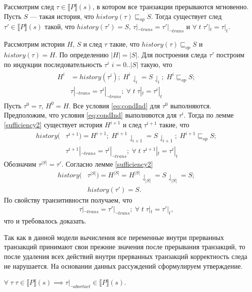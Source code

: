 \begin{lemma}\label{sufficiency3}
Рассмотрим след $\tau \in \llbracket P \rrbracket (s)$, в котором все транзакции прерываются мгновенно. Пусть $S$ --- такая история, что $history(\tau) \sqsubseteq_{op} S$. Тогда существует след $\tau' \in \llbracket P \rrbracket (s)$ такой, что $history(\tau') = S$, $\tau|_{\neg trans} = \tau'|_{\neg trans}$ и $\forall \; t \; \tau'|_t = \tau|_t$. \end{lemma}
\begin{myproof}
Рассмотрим истории $H$, $S$ и след $\tau$ такие, что $history(\tau) \sqsubseteq_{op} S$ и $history(\tau) = H$. По определению $|H| = |S|$. Для построения следа $\tau'$ построим по индукции последовательность $\tau^i$ $i = 0..|S|$ такую, что
\begin{align}\label{eq:condInd}
\begin{split}
H^i &= history(\tau^i); \; H^i \downharpoonleft_{i} = S \downharpoonleft_{i}; \; H^i \sqsubseteq_{op} S; \\
&\tau|_{\neg trans} = \tau^i|_{\neg trans}; \; \forall \; t \; \tau|_{t} = \tau^i|_{t}
\end{split} 
\end{align}
Пусть $\tau^0 = \tau$, $H^0 = H$. Все условия \eqref{eq:condInd} для $\tau^0$ выполняются. Предположим, что условия \eqref{eq:condInd} выполняются для $\tau^i$. Тогда по лемме \ref{sufficiency2} существует история $H^{i+1}$ и след $\tau^{i+1}$ такие, что
\begin{align*}
history(&\tau^{i+1}) = H^{i+1}; \; H^{i+1}\downharpoonleft_{i+1} = S\downharpoonleft_{i+1}; \; H^{i+1} \sqsubseteq_{op} S; \\ 
&\tau^{i+1}|_{\neg trans} = \tau^i|_{\neg trans}; \; \forall \; t \; \tau^{i+1}|_{t} = \tau^i|_{t}
\end{align*}
Обозначим $\tau^{|S|} = \tau'$. Согласно лемме \ref{sufficiency2}
\begin{align*}
history(&\tau^{|S|}) = H^{|S|} = H^{|S|}\downharpoonleft_{|S|} = S\downharpoonleft_{|S|} = S;\\ 
&history(\tau') = S.
\end{align*}
По свойству транзитивности получаем, что 
\begin{align*}
\tau|_{\neg trans} = \tau'|_{\neg trans}; \; \forall \; t \; \tau|_{t} = \tau'|_{t},
\end{align*}
что и требовалось доказать.
\end{myproof}
Так как в данной модели вычисления все переменные внутри прерванных транзакций принимают свои прежние значения после прерывания транзакций, то после удаления всех действий внутри прерванных транзакций корректность следа не нарушается. На основании данных рассуждений сформулируем утверждение.
\begin{mystatement}\label{statement1}
$\forall \; \tau \; \tau \in \llbracket P \rrbracket (s) \implies \tau|_{\neg abortact} \in \llbracket P \rrbracket (s).$
\end{mystatement}

